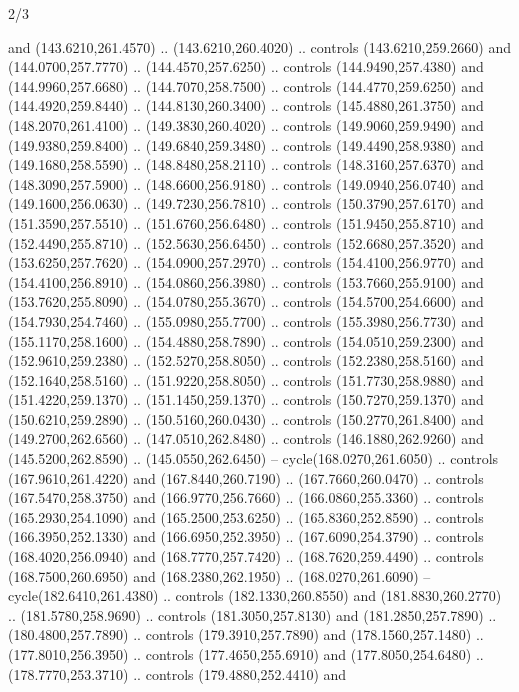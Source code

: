\begin{flagdescription}{2/3}
\begin{scope}[xshift=0.5\flaglength,yshift=0.5\flagwidth,scale=\stretchfactor]
\begin{scope}[scale=0.001645\flagwidth,yshift=65mm,xshift=-63mm]
\begin{scope}[y=0.80pt, x=0.80pt, yscale=-1,]
\begin{scope}[cm={{1.33333,0.0,0.0,1.33333,(0.0,1e-05)}}]
  and (143.6210,261.4570) .. (143.6210,260.4020) .. controls (143.6210,259.2660)
  and (144.0700,257.7770) .. (144.4570,257.6250) .. controls (144.9490,257.4380)
  and (144.9960,257.6680) .. (144.7070,258.7500) .. controls (144.4770,259.6250)
  and (144.4920,259.8440) .. (144.8130,260.3400) .. controls (145.4880,261.3750)
  and (148.2070,261.4100) .. (149.3830,260.4020) .. controls (149.9060,259.9490)
  and (149.9380,259.8400) .. (149.6840,259.3480) .. controls (149.4490,258.9380)
  and (149.1680,258.5590) .. (148.8480,258.2110) .. controls (148.3160,257.6370)
  and (148.3090,257.5900) .. (148.6600,256.9180) .. controls (149.0940,256.0740)
  and (149.1600,256.0630) .. (149.7230,256.7810) .. controls (150.3790,257.6170)
  and (151.3590,257.5510) .. (151.6760,256.6480) .. controls (151.9450,255.8710)
  and (152.4490,255.8710) .. (152.5630,256.6450) .. controls (152.6680,257.3520)
  and (153.6250,257.7620) .. (154.0900,257.2970) .. controls (154.4100,256.9770)
  and (154.4100,256.8910) .. (154.0860,256.3980) .. controls (153.7660,255.9100)
  and (153.7620,255.8090) .. (154.0780,255.3670) .. controls (154.5700,254.6600)
  and (154.7930,254.7460) .. (155.0980,255.7700) .. controls (155.3980,256.7730)
  and (155.1170,258.1600) .. (154.4880,258.7890) .. controls (154.0510,259.2300)
  and (152.9610,259.2380) .. (152.5270,258.8050) .. controls (152.2380,258.5160)
  and (152.1640,258.5160) .. (151.9220,258.8050) .. controls (151.7730,258.9880)
  and (151.4220,259.1370) .. (151.1450,259.1370) .. controls (150.7270,259.1370)
  and (150.6210,259.2890) .. (150.5160,260.0430) .. controls (150.2770,261.8400)
  and (149.2700,262.6560) .. (147.0510,262.8480) .. controls (146.1880,262.9260)
  and (145.5200,262.8590) .. (145.0550,262.6450) -- cycle(168.0270,261.6050) ..
  controls (167.9610,261.4220) and (167.8440,260.7190) .. (167.7660,260.0470) ..
  controls (167.5470,258.3750) and (166.9770,256.7660) .. (166.0860,255.3360) ..
  controls (165.2930,254.1090) and (165.2500,253.6250) .. (165.8360,252.8590) ..
  controls (166.3950,252.1330) and (166.6950,252.3950) .. (167.6090,254.3790) ..
  controls (168.4020,256.0940) and (168.7770,257.7420) .. (168.7620,259.4490) ..
  controls (168.7500,260.6950) and (168.2380,262.1950) .. (168.0270,261.6090) --
  cycle(182.6410,261.4380) .. controls (182.1330,260.8550) and
  (181.8830,260.2770) .. (181.5780,258.9690) .. controls (181.3050,257.8130) and
  (181.2850,257.7890) .. (180.4800,257.7890) .. controls (179.3910,257.7890) and
  (178.1560,257.1480) .. (177.8010,256.3950) .. controls (177.4650,255.6910) and
  (177.8050,254.6480) .. (178.7770,253.3710) .. controls (179.4880,252.4410) and

\end{scope}
\end{scope}
\end{scope}
\end{scope}
\end{flagdescription}
